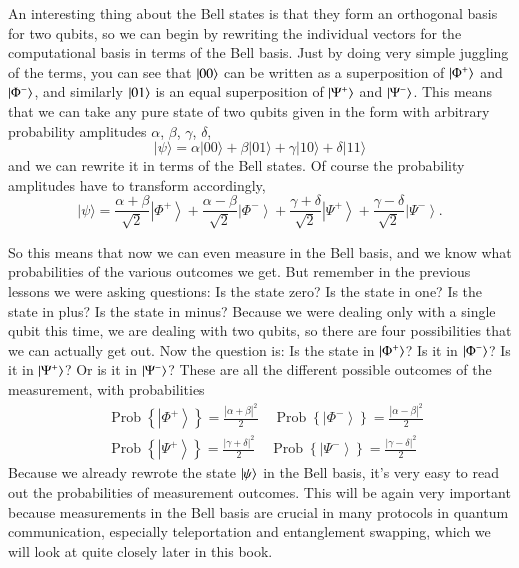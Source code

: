 An interesting thing about the Bell states is that they form an orthogonal basis for two qubits, so we can begin by rewriting the individual vectors for the computational basis in terms of the Bell basis. Just by doing very simple juggling of the terms, you can see that $\ket{00}$ can be written as a superposition of $\ket{\Phi^+}$ and $\ket{\Phi^-}$, and similarly $\ket{01}$ is an equal superposition of $\ket{\Psi^+}$ and $\ket{\Psi^-}$.
This means that we can take any pure state of two qubits given in the form with arbitrary probability amplitudes $\alpha$, $\beta$, $\gamma$, $\delta$,
\begin{equation}
|\psi\rangle=\alpha|00\rangle+\beta|01\rangle+\gamma|10\rangle+\delta|11\rangle
\end{equation}
and we can rewrite it in terms of the Bell states.  Of course the probability amplitudes have to transform accordingly,
\begin{equation}
|\psi\rangle=\frac{\alpha+\beta}{\sqrt{2}}\left|\Phi^{+}\right\rangle+\frac{\alpha-\beta}{\sqrt{2}}\left|\Phi^{-}\right\rangle+\frac{\gamma+\delta}{\sqrt{2}}\left|\Psi^{+}\right\rangle+\frac{\gamma-\delta}{\sqrt{2}}\left|\Psi^{-}\right\rangle.
\end{equation}

So this means that now we can even measure in the Bell basis, and we know what probabilities of the various outcomes we get. But remember in the previous lessons we were asking questions: Is the state zero? Is the state in one? Is the state in plus? Is the state in minus? Because we were dealing only with a single qubit this time, we are dealing with two qubits, so there are four possibilities that we can actually get out. Now the question is: Is the state in $\ket{\Phi^+}$? Is it in $\ket{\Phi^-}$? Is it in $\ket{\Psi^+}$? Or is it in $\ket{\Psi^-}$? These are all the different possible outcomes of the measurement, with probabilities
\begin{equation}
\begin{aligned}
&\operatorname{Prob}\left\{\left|\Phi^{+}\right\rangle\right\}=\frac{|\alpha+\beta|^{2}}{2} \quad \operatorname{Prob}\left\{\left|\Phi^{-}\right\rangle\right\}=\frac{|\alpha-\beta|^{2}}{2} \\
&\operatorname{Prob}\left\{\left|\Psi^{+}\right\rangle\right\}=\frac{|\gamma+\delta|^{2}}{2} \quad \operatorname{Prob}\left\{\left|\Psi^{-}\right\rangle\right\}=\frac{|\gamma-\delta|^{2}}{2}
\end{aligned}
\end{equation}
Because we already rewrote the state $\ket{\psi}$ in the Bell basis, it's very easy to read out the probabilities of measurement outcomes.
This will be again very important because measurements in the Bell basis are crucial in many protocols in quantum communication, especially teleportation and entanglement swapping, which we will look at quite closely later in this book.

